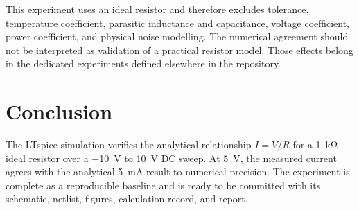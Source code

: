 \documentclass[11pt,a4paper]{article}
\begin{document}
This experiment uses an ideal resistor and therefore excludes tolerance, temperature coefficient, parasitic inductance and capacitance, voltage coefficient, power coefficient, and physical noise modelling. The numerical agreement should not be interpreted as validation of a practical resistor model. Those effects belong in the dedicated experiments defined elsewhere in the repository.

\section{Conclusion}

The LTspice simulation verifies the analytical relationship $I=V/R$ for a \SI{1}{\kilo\ohm} ideal resistor over a \SI{-10}{\volt} to \SI{10}{\volt} DC sweep. At \SI{5}{\volt}, the measured current agrees with the analytical \SI{5}{\milli\ampere} result to numerical precision. The experiment is complete as a reproducible baseline and is ready to be committed with its schematic, netlist, figures, calculation record, and report.

\nocite{sedra_smith,ltspice_help}
\printbibliography
\end{document}

